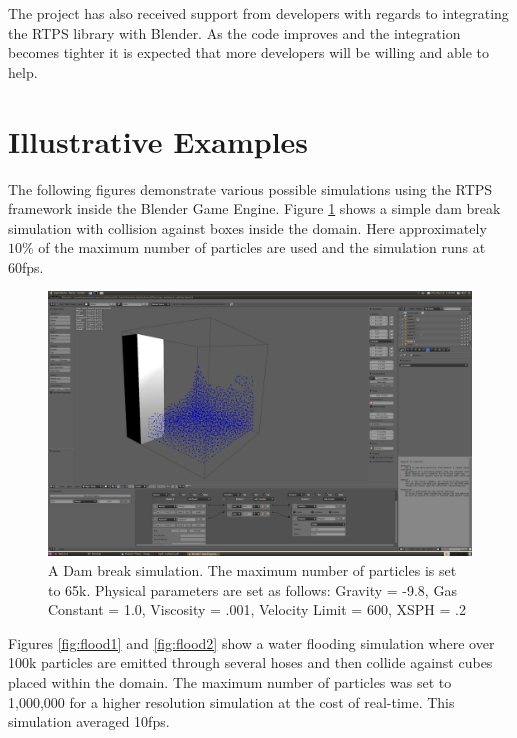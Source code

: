The project has also received support from developers with regards to
integrating the RTPS library with Blender. As the code improves and the
integration becomes tighter it is expected that more developers will be willing
and able to help.

\pagebreak

\section{Illustrative Examples}

The following figures demonstrate various possible simulations using the RTPS
framework inside the Blender Game Engine. Figure \ref{fig:dam_break} shows a
simple dam break simulation with collision against boxes inside the domain.
Here approximately $10\%$ of the maximum number of particles are used and the simulation runs at 60fps.

\begin{figure}[!htc]
		\includegraphics[scale=0.4]{figures/dam_break.png}
        \caption{ A Dam break simulation. The maximum number of particles is set to 65k.
        Physical parameters are set as follows: Gravity = -9.8, Gas
        Constant = 1.0, Viscosity = .001, Velocity Limit = 600, XSPH = .2}
		\label{fig:dam_break}
\end{figure}

\pagebreak
\clearpage

Figures \ref{fig:flood1} and \ref{fig:flood2} show a water flooding simulation where
over 100k particles are emitted through several hoses and then collide against
cubes placed within the domain. The maximum number of particles was set to
1,000,000 for a higher resolution simulation at the cost of real-time. This
simulation averaged 10fps.


